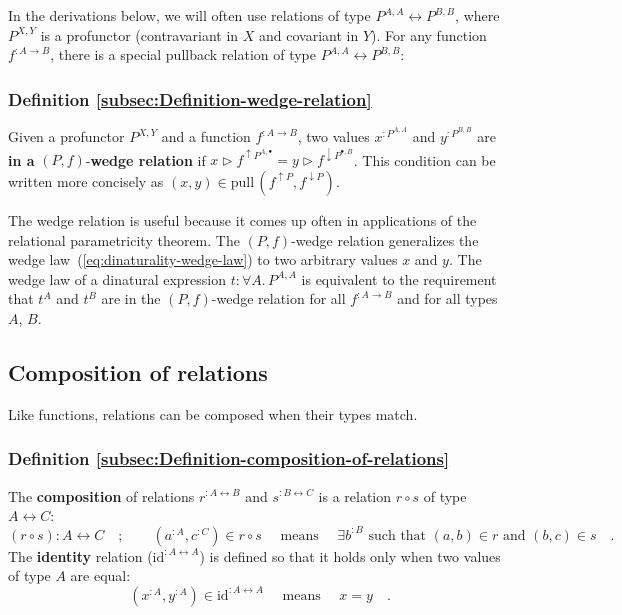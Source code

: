 In the derivations below, we will often use relations of type $P^{A,A}\leftrightarrow P^{B,B}$,
where $P^{X,Y}$ is a profunctor (contravariant in $X$ and covariant
in $Y$). For any function $f^{:A\rightarrow B}$, there is a special
pullback relation of type $P^{A,A}\leftrightarrow P^{B,B}$: 

\subsubsection{Definition \label{subsec:Definition-wedge-relation}\ref{subsec:Definition-wedge-relation}}

Given a profunctor
$P^{X,Y}$ and a function $f^{:A\rightarrow B}$, two values $x^{:P^{A,A}}$
and $y^{:P^{B,B}}$ are \textbf{in a} $\left(P,f\right)$-\textbf{wedge
relation} if $x\triangleright f^{\uparrow P^{A,\bullet}}=y\triangleright f^{\downarrow P^{\bullet,B}}$.
This condition can be written more concisely as $(x,y)\in\text{pull}\,(f^{\uparrow P},f^{\downarrow P})$.

The wedge relation is useful because it comes up often in applications
of the relational parametricity theorem. The $\left(P,f\right)$-wedge
relation generalizes the wedge law~(\ref{eq:dinaturality-wedge-law})
to two arbitrary values $x$ and $y$. The wedge law of a dinatural
expression $t:\forall A.\,P^{A,A}$ is equivalent to the requirement
that $t^{A}$ and $t^{B}$ are in the $\left(P,f\right)$-wedge relation
for all $f^{:A\rightarrow B}$ and for all types $A$, $B$.

\subsection{Composition of relations}

Like functions, relations can be composed when their types match.

\subsubsection{Definition \label{subsec:Definition-composition-of-relations}\ref{subsec:Definition-composition-of-relations}}

The \textbf{composition} of relations $r^{:A\leftrightarrow B}$ and
$s^{:B\leftrightarrow C}$ is a relation $r\circ s$ of type $A\leftrightarrow C$:
\[
(r\circ s):A\leftrightarrow C\quad;\quad\quad(a^{:A},c^{:C})\in r\circ s\quad\text{ means }\quad\exists b^{:B}\text{ such that }(a,b)\in r\text{ and }(b,c)\in s\quad.
\]
The \textbf{identity} relation ($\text{id}^{:A\leftrightarrow A}$)
is defined so that it holds only when two values of type $A$ are
equal:
\[
(x^{:A},y^{:A})\in\text{id}^{:A\leftrightarrow A}\quad\text{ means }\quad x=y\quad.
\]

